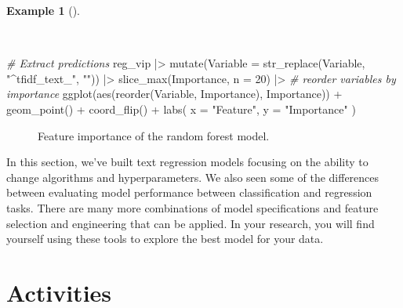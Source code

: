 \documentclass[
  letterpaper,
]{latex/krantz}
\newenvironment{Shaded}{\begin{snugshade}}{\end{snugshade}}
\newcommand{\AttributeTok}[1]{\textcolor[rgb]{0.00,0.00,0.00}{#1}}
\newcommand{\CommentTok}[1]{\textcolor[rgb]{0.00,0.00,0.00}{\textit{#1}}}
\newcommand{\DecValTok}[1]{\textcolor[rgb]{0.00,0.00,0.00}{#1}}
\newcommand{\FunctionTok}[1]{\textcolor[rgb]{0.00,0.00,0.00}{#1}}
\newcommand{\NormalTok}[1]{\textcolor[rgb]{0.00,0.00,0.00}{#1}}
\newcommand{\SpecialCharTok}[1]{\textcolor[rgb]{0.00,0.00,0.00}{#1}}
\newcommand{\StringTok}[1]{\textcolor[rgb]{0.00,0.00,0.00}{#1}}
\theoremstyle{definition}
\newtheorem{example}{Example}[chapter]
\theoremstyle{remark}
\begin{document}
\begin{example}[]\protect\hypertarget{exm-pda-reg-final-fit-vip-visualize}{}\label{exm-pda-reg-final-fit-vip-visualize}

~

\begin{Shaded}
\begin{Highlighting}[]
\CommentTok{\# Extract predictions}
\NormalTok{reg\_vip }\SpecialCharTok{|\textgreater{}}
  \FunctionTok{mutate}\NormalTok{(}\AttributeTok{Variable =} \FunctionTok{str\_replace}\NormalTok{(Variable, }\StringTok{"\^{}tfidf\_text\_"}\NormalTok{, }\StringTok{""}\NormalTok{)) }\SpecialCharTok{|\textgreater{}}
  \FunctionTok{slice\_max}\NormalTok{(Importance, }\AttributeTok{n =} \DecValTok{20}\NormalTok{) }\SpecialCharTok{|\textgreater{}}
  \CommentTok{\# reorder variables by importance}
  \FunctionTok{ggplot}\NormalTok{(}\FunctionTok{aes}\NormalTok{(}\FunctionTok{reorder}\NormalTok{(Variable, Importance), Importance)) }\SpecialCharTok{+}
  \FunctionTok{geom\_point}\NormalTok{() }\SpecialCharTok{+}
  \FunctionTok{coord\_flip}\NormalTok{() }\SpecialCharTok{+}
  \FunctionTok{labs}\NormalTok{(}
    \AttributeTok{x =} \StringTok{"Feature"}\NormalTok{,}
    \AttributeTok{y =} \StringTok{"Importance"}
\NormalTok{  )}
\end{Highlighting}
\end{Shaded}

\begin{figure}[H]


\caption{\label{fig-pda-reg-final-fit-vip-visualize}Feature importance
of the random forest model.}

\end{figure}%

\end{example}

In this section, we've built text regression models focusing on the
ability to change algorithms and hyperparameters. We also seen some of
the differences between evaluating model performance between
classification and regression tasks. There are many more combinations of
model specifications and feature selection and engineering that can be
applied. In your research, you will find yourself using these tools to
explore the best model for your data.

\section*{Activities}\label{activities-7}
\end{document}
